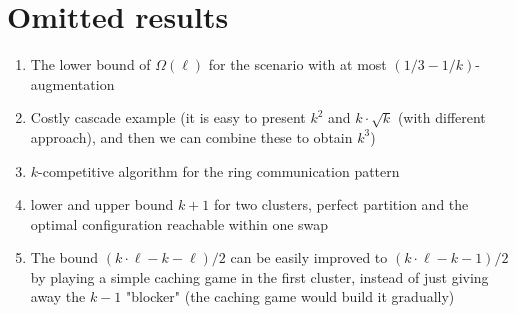 \documentclass[manuscript,screen=true, review, anonymous]{acmart}
\begin{document}
\pagebreak
\appendix


\section{Omitted results}

\begin{enumerate}
  		 \item The lower bound of $\Omega(\ell)$ for the scenario with at most $(1/3-1/k)$-augmentation
  
  		 \item Costly cascade example (it is easy to present $k^2$ and $k\cdot \sqrt{k}$ (with different approach), and then we can combine these to obtain $k^3$)
  
  		 \item $k$-competitive algorithm for the ring communication pattern
       
       \item lower and upper bound $k+1$ for two clusters, perfect partition and the optimal configuration reachable within one swap
       \item 
       The bound $(k \cdot \ell - k - \ell) / 2$ can be easily improved to $(k \cdot \ell - k - 1) / 2$ by playing a simple caching game in the first cluster, instead of just giving away the $k-1$ "blocker" (the caching game would build it gradually)
  
  \end{enumerate}
\end{document}
